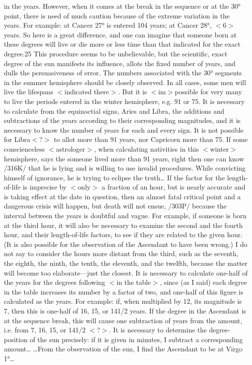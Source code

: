 in the years. However, when it comes at the break in the sequence or at the 30° point, there is need of
much caution because of the extreme variation in the years. For example: at Cancer 27° is entered 104
years; at Cancer 28°, $<$6$>$ years. So here is a great difference, and one can imagine that someone born at
these degrees will live or die more or less time than that indicated for the exact degree.25 This procedure
seems to be unbelievable, but the scientific, exact degree of the sun manifests its influence, allots the fixed
number of years, and dulls the persuasiveness of error.
The numbers associated with the 30° segments in the summer hemisphere should be closely observed.
In all cases, some men will live the lifespans $<$indicated there$>$. But it is $<$im$>$possible for very many to
live the periods entered in the winter hemisphere, e.g. 91 or 75. It is necessary to calculate from the
equinoctial signs, Aries and Libra, the additions and subtractions of the years according to their
corresponding magnitudes, and it is necessary to know the number of years for each and every sign. It is
not possible for Libra$<$?$>$ to allot more than 91 years, nor Capricorn more than 75. If some conscienceless
$<$astrologer$>$, when calculating nativities in this $<$winter$>$ hemisphere, says the someone lived more than
91 years, right then one can know /316K/ that he is lying and is willing to use invalid procedures. While
convicting himself of ignorance, he is trying to eclipse the truth…
If the factor for the length-of-life is imprecise by $<$only$>$ a fraction of an hour, but is nearly accurate and
is taking effect at the date in question, then an almost fatal critical point and a dangerous crisis will happen,
but death will not ensue, /303P/ because the interval between the years is doubtful and vague. For
example, if someone is born at the third hour, it will also be necessary to examine the second and the
fourth hour, and their length-of-life factors, to see if they are related to the given hour. (It is also possible
for the observation of the Ascendant to have been wrong.) I do not say to consider the hours more distant
from the third, such as the seventh, the eighth, the ninth, the tenth, the eleventh, and the twelfth, because
the matter will become too elaborate—just the closest. It is necessary to calculate one-half of the years for
the degrees following $<$in the table$>$, since (as I said) each degree in the table increases its number by a
factor of two, and one-half of this figure is calculated as the years. For example: if, when multiplied by 12,
its magnitude is 7, then this is one-half of 16, 15, or 141/2 years. If the degree in the Ascendant is at the
sequence break, this will cause one subtraction of years from the amount, i.e. from 7, 16, 15, or 141/2 $<$?$>$.
It is necessary to determine the degree-position of the sun precisely: if it is given in minutes, I subtract
a corresponding amount…
…From the observation of the sun, I find the Ascendant to be at Virgo 1°…

\newpage